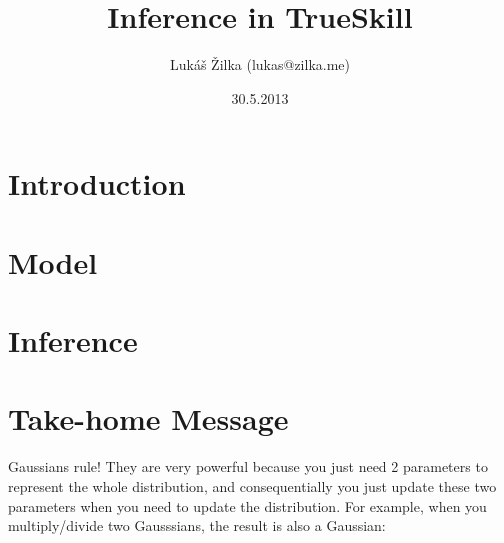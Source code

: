 \documentclass[12pt]{article}
\title{Inference in TrueSkill}
\date{30.5.2013}
\author{Lukáš Žilka (lukas@zilka.me)}
\begin{document}

\newcommand{\Normal}[0]{\mathcal{N}}
\newcommand{\dx}[1]{\mathrm{d}#1}

\newcount\colveccount
\newcommand*\colvec[1]{
        \global\colveccount#1
        \begin{bmatrix}
        \colvecnext
}
\def\colvecnext#1{
        #1
        \global\advance\colveccount-1
        \ifnum\colveccount>0
                \\
                \expandafter\colvecnext
        \else
                \end{bmatrix}
        \fi
}

\maketitle


\section{Introduction}

\section{Model}

\section{Inference}

\section{Take-home Message}

Gaussians rule! They are very powerful because you just need 2 parameters to represent the whole distribution, and consequentially you just update these two parameters when you need to update the distribution. For example, when you multiply/divide two Gausssians, the result is also a Gaussian:
\end{document}
